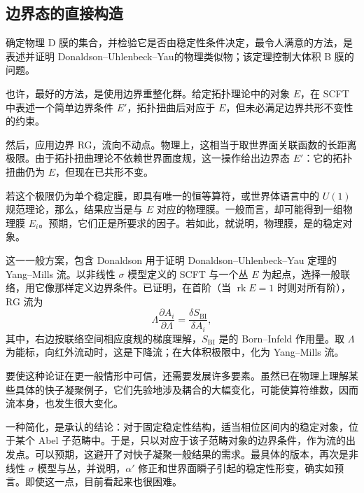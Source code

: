 \subsection{边界态的直接构造}\label{sec:5.9.3}

确定物理 D 膜的集合，并检验它是否由稳定性条件决定，最令人满意的方法，是表述并证明 Donaldson--Uhlenbeck--Yau的物理类似物；该定理控制大体积 B 膜的问题。

也许，最好的方法，是使用边界重整化群。给定拓扑理论中的对象 $E$，在 SCFT 中表述一个简单边界条件 $E'$，拓扑扭曲后对应于 $E$，但未必满足边界共形不变性的约束。

然后，应用边界 RG，流向不动点。物理上，这相当于取世界面关联函数的长距离极限。由于拓扑扭曲理论不依赖世界面度规，这一操作给出边界态 $E'$：它的拓扑扭曲仍为 $E$，但现在已共形不变。

若这个极限仍为单个稳定膜，即具有唯一的恒等算符，或世界体语言中的 $U(1)$ 规范理论，那么，结果应当是与 $E$ 对应的物理膜。一般而言，却可能得到一组物理膜 $E_i$。预期，它们正是所要求的因子。若如此，就说明，物理膜，是的稳定对象。

这一一般方案，包含 Donaldson 用于证明 Donaldson--Uhlenbeck--Yau 定理的 Yang--Mills 流。以非线性 $\sigma$ 模型定义的 SCFT 与一个丛 $E$ 为起点，选择一般联络，用它像那样定义边界条件。已证明，在首阶（当 $\operatorname{rk}E=1$ 时则对所有阶），RG 流为
\[
\Lambda\frac{\partial A_i}{\partial\Lambda}
=\frac{\delta S_{\mathrm{BI}}}{\delta A_i},
\]
其中，右边按联络空间相应度规的梯度理解，$S_{\mathrm{BI}}$ 是的 Born--Infeld 作用量。取 $\Lambda$ 为能标，向红外流动时，这是下降流；在大体积极限中，化为 Yang--Mills 流。

要使这种论证在更一般情形中可信，还需要发展许多要素。虽然已在物理上理解某些具体的快子凝聚例子，它们先验地涉及耦合的大幅变化，可能使算符维数，因而流本身，也发生很大变化。

一种简化，是承认的结论：对于固定稳定性结构，适当相位区间内的稳定对象，位于某个 Abel 子范畴中。于是，只以对应于该子范畴对象的边界条件，作为流的出发点。可以预期，这避开了对快子凝聚一般结果的需求。最具体的版本，再次是非线性 $\sigma$ 模型与丛，并说明，$\alpha'$ 修正和世界面瞬子引起的稳定性形变，确实如预言。即使这一点，目前看起来也很困难。

